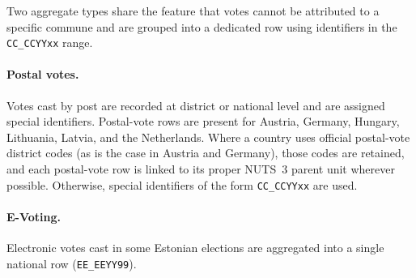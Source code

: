 Two aggregate types share the feature that votes cannot be attributed to a
specific commune and are grouped into a dedicated row using identifiers in the
\texttt{CC\_CCYYxx} range.

\paragraph{Postal votes.}
Votes cast by post are recorded at district or national level and are assigned
special identifiers.
Postal-vote rows are present for Austria, Germany, Hungary, Lithuania, Latvia,
and the Netherlands.
Where a country uses official postal-vote district codes (as is the case in
Austria and Germany), those codes are retained, and
each postal-vote row is linked to its proper NUTS~3 parent unit wherever
possible. Otherwise, special identifiers of the form \texttt{CC\_CCYYxx} are used.

\paragraph{E-Voting.}
Electronic votes cast in some Estonian elections are aggregated into a single
national row (\texttt{EE\_EEYY99}).
